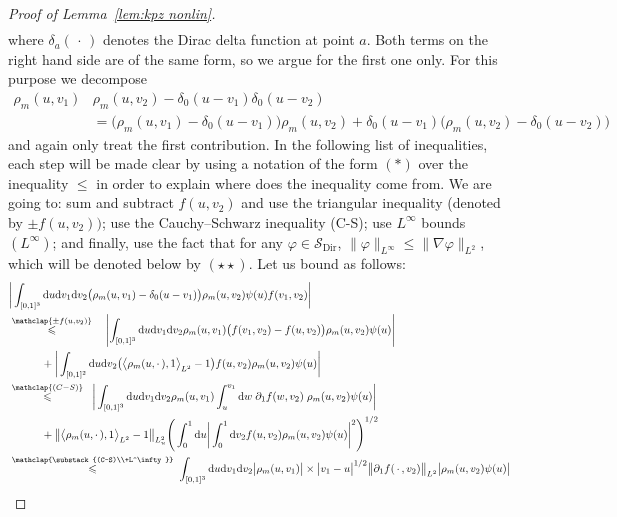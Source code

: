 \documentclass[AHL,Unicode,longabstracts]{cedram}
\DeclareMathOperator{\Dir}{Dir}
\newcommand{\mc}[1]{{\mathcal #1}}
\renewcommand{\mc}[1]{{\mathcal #1}}
\newcommand{\Ctwo}{\ensuremath{\mc S_{\Dir}}}
\renewcommand{\leq}{\leqslant}
\newcommand*{\dd}{\mathrm{d}}
\newcommand*{\du}{\dd u}
\newcommand*{\dv}{\dd v}
\newcommand*{\dw}{\dd w}
\begin{document}
\begin{proof}[Proof of Lemma~\ref{lem:kpz nonlin}]
\begin{align*}
\end{align*}
where $\delta_a({\,\cdot\,})$ denotes the Dirac delta function at point $a$. Both terms on the right hand side are of the same form, so we argue for the first one only. For this purpose we decompose
\begin{align*}
\rho_m (u, v_1) &\rho_m (u, v_2) - \delta_0(u - v_1) \delta_0(u - v_2)\\
&= \big(\rho_m (u, v_1) - \delta_0(u - v_1)\big) \rho_m (u, v_2) + \delta_0(u - v_1)
\big(\rho_m (u, v_2) - \delta_0(u - v_2)\big)
\end{align*}
and again only treat the first contribution. In the following list of inequalities, each step will be made clear by using a notation of the form $(*)$ over the inequality $\leq$ in order to explain where does the inequality come from. We are going to: sum and subtract $f(u,v_2)$ and use the triangular inequality (denoted by $\pm f(u,v_2))$; use the Cauchy--Schwarz inequality (C-S); use $L^\infty$ bounds $(L^\infty)$; and finally, use the fact that for any $\varphi \in \Ctwo$, $\|\varphi\|_{L^\infty} \leqslant \|\nabla\varphi\|_{L^2}$, which will be denoted below by $(\star\star)$. Let us bound as follows:
\begingroup
\allowdisplaybreaks
\begin{align*}
&\bigg| \int_{[0, 1]^3} \du \dv_1 \dv_2 \big(\rho_m (u, v_1) -
\delta_0(u- v_1)\big) \rho_m (u, v_2) \psi (u) f (v_1, v_2) \bigg|\\
&\overset{\mathclap{\pm f(u,v_2)}}{\leq}\quad \left| \int_{[0, 1]^3} \du \dv_1 \dv_2 \rho_m (u, v_1) \big(f (v_1, v_2) - f (u, v_2)\big) \rho_m (u, v_2) \psi (u) \right|\\*
&\qquad \quad + \bigg| \int_{[0, 1]^2} \du \dv_2 \big(\big\langle \rho_m (u, \cdot\,), 1 \big\rangle_{L^2} - 1\big) f (u, v_2) \rho_m (u, v_2) \psi (u) \bigg|\\
&\overset{\mathclap{(C-S)}}{\leq} \;\;\bigg| \int_{[0, 1]^3} \du \dv_1 \dv_2 \rho_m (u, v_1) \int_u^{v_1}\dw\; \partial_1 f (w, v_2)\; \rho_m (u, v_2) \psi (u) \bigg|\\*
&\qquad \quad+ \big\| \big\langle \rho_m (u, \cdot\,), 1 \big\rangle_{L^2} - 1 \big\|_{L^2_u} \Bigg(\int_0^1 \du \bigg| \int_0^1 \dv_2 f (u, v_2) \rho_m (u, v_2) \psi (u)
\bigg|^2 \Bigg)^{1/2}\\
&\overset{\mathclap{\substack{(C-S)\\+L^\infty}}}{\leq}\; \int_{[0, 1]^3} \du \dv_1 \dv_2 \big| \rho_m (u, v_1)\big| \times \big| v_1 - u \big|^{1/2} \big\| \partial_1 f(\,\cdot\,,v_2) \big\|_{L^2} \big| \rho_m (u, v_2) \psi (u) \big|\\*

\end{align*}
\end{proof}
\end{document}
